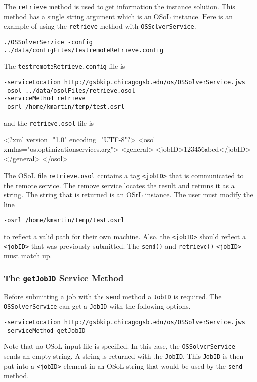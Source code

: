 \documentclass[11pt]{article}
\renewcommand{\_}{{\char"5F}}
\renewcommand{\{}{{\char"7B}}
\renewcommand{\}}{{\char"7D}}
\renewcommand{\^}{{\char"0D}}
\renewcommand{\'}{{\char"0D}}
\begin{document}
The {\tt retrieve} method is used to get information the instance solution.  This method has a single string argument which is an OSoL instance. Here is an example of using the {\tt retrieve} method with {\tt OSSolverService}.
\begin{verbatim}
./OSSolverService -config ../data/configFiles/testremoteRetrieve.config
\end{verbatim}
The {\tt testremoteRetrieve.config} file is
\begin{verbatim}
-serviceLocation http://gsbkip.chicagogsb.edu/os/OSSolverService.jws
-osol ../data/osolFiles/retrieve.osol
-serviceMethod retrieve
-osrl /home/kmartin/temp/test.osrl
\end{verbatim}
and the {\tt retrieve.osol} file is
\begin{verbatimtab}[4]
<?xml version="1.0" encoding="UTF-8"?>
<osol xmlns="os.optimizationservices.org">
 	<general>
 		<jobID>123456abcd</jobID>
	</general>
</osol>
\end{verbatimtab}
The OSoL file {\tt retrieve.osol} contains a tag {\tt <jobID>} that is communicated to the remote service. The remove service locates the result and returns it as a string. The string that is returned is an OSrL instance.  The user must modify the line
\begin{verbatim}
-osrl /home/kmartin/temp/test.osrl
\end{verbatim}
to reflect a valid path for their own machine.  Also, the {\tt <jobID>} should reflect a {\tt <jobID>} that was previously submitted. The {\tt send()} and {\tt retrieve()}  {\tt <jobID>} must match up.

\subsubsection{The  {\tt getJobID} Service Method}\label{section:getjobid}

Before  submitting a job with the {\tt send} method a {\tt JobID} is required. The {\tt OSSolverService} can get a {\tt JobID} with
the following options.
\begin{verbatim}
-serviceLocation http://gsbkip.chicagogsb.edu/os/OSSolverService.jws
-serviceMethod getJobID
\end{verbatim}
Note that no OSoL input file is specified. In this case, the {\tt OSSolverService} sends an empty string. A string is returned with the {\tt JobID}. This {\tt JobID} is then put into a {\tt <jobID>} element in an OSoL string that would be used by the {\tt send} method.
\end{document}
